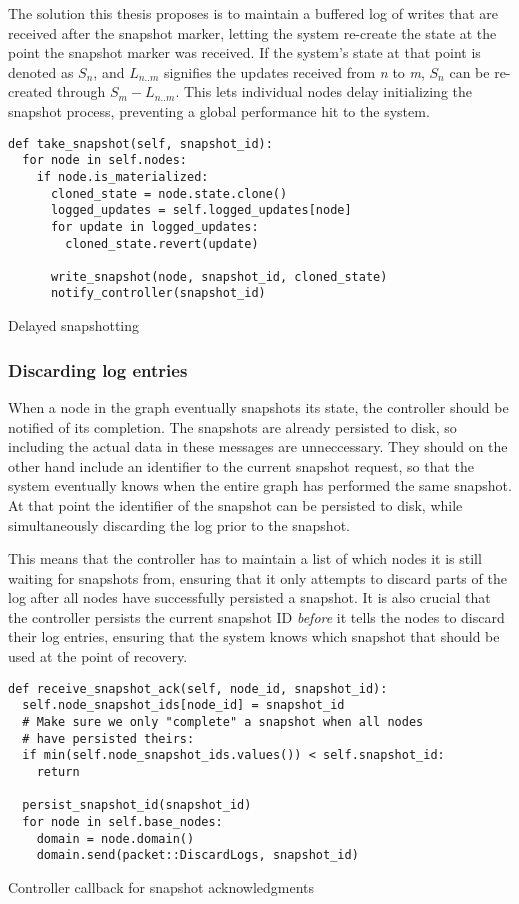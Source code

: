 \documentclass[b5paper]{report}
\begin{document}
The solution this thesis proposes is to maintain a buffered log of writes that
are received after the snapshot marker, letting the system re-create the state
at the point the snapshot marker was received. If the system's state at that
point is denoted as $ S_n $, and $ L_{n..m} $ signifies the updates received
from \textit{n} to \textit{m}, $ S_n $ can be re-created through
$ S_m - L_{n..m} $. This lets individual nodes delay initializing the snapshot
process, preventing a global performance hit to the system.

\begin{listing}[H]
  \begin{verbatim}
def take_snapshot(self, snapshot_id):
  for node in self.nodes:
    if node.is_materialized:
      cloned_state = node.state.clone()
      logged_updates = self.logged_updates[node]
      for update in logged_updates:
        cloned_state.revert(update)

      write_snapshot(node, snapshot_id, cloned_state)
      notify_controller(snapshot_id)
  \end{verbatim}
  \caption{Delayed snapshotting}
\end{listing}

\subsubsection{Discarding log entries}
When a node in the graph eventually snapshots its state, the controller should
be notified of its completion. The snapshots are already persisted to disk, so
including the actual data in these messages are unneccessary. They should on the
other hand include an identifier to the current snapshot request, so that the
system eventually knows when the entire graph has performed the same snapshot.
At that point the identifier of the snapshot can be persisted to disk, while
simultaneously discarding the log prior to the snapshot.

This means that the controller has to maintain a list of which nodes it is still
waiting for snapshots from, ensuring that it only attempts to discard parts of
the log after all nodes have successfully persisted a snapshot. It is also
crucial that the controller persists the current snapshot ID \textit{before} it
tells the nodes to discard their log entries, ensuring that the system knows
which snapshot that should be used at the point of recovery.

\begin{listing}[H]
  \begin{verbatim}
def receive_snapshot_ack(self, node_id, snapshot_id):
  self.node_snapshot_ids[node_id] = snapshot_id
  # Make sure we only "complete" a snapshot when all nodes
  # have persisted theirs:
  if min(self.node_snapshot_ids.values()) < self.snapshot_id:
    return

  persist_snapshot_id(snapshot_id)
  for node in self.base_nodes:
    domain = node.domain()
    domain.send(packet::DiscardLogs, snapshot_id)
  \end{verbatim}
  \caption{Controller callback for snapshot acknowledgments}
\end{listing}
\end{document}
